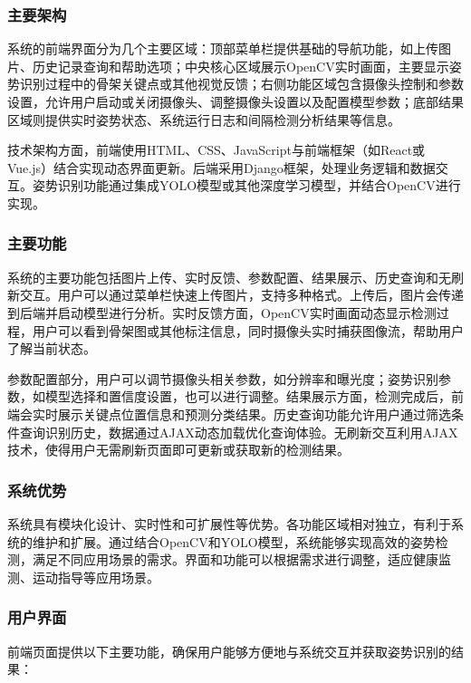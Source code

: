 \subsubsection{主要架构}

系统的前端界面分为几个主要区域：顶部菜单栏提供基础的导航功能，如上传图片、历史记录查询和帮助选项；中央核心区域展示OpenCV实时画面，主要显示姿势识别过程中的骨架关键点或其他视觉反馈；右侧功能区域包含摄像头控制和参数设置，允许用户启动或关闭摄像头、调整摄像头设置以及配置模型参数；底部结果区域则提供实时姿势状态、系统运行日志和间隔检测分析结果等信息。

技术架构方面，前端使用HTML、CSS、JavaScript与前端框架（如React或Vue.js）结合实现动态界面更新。后端采用Django框架，处理业务逻辑和数据交互。姿势识别功能通过集成YOLO模型或其他深度学习模型，并结合OpenCV进行实现。

\subsubsection{主要功能}

系统的主要功能包括图片上传、实时反馈、参数配置、结果展示、历史查询和无刷新交互。用户可以通过菜单栏快速上传图片，支持多种格式。上传后，图片会传递到后端并启动模型进行分析。实时反馈方面，OpenCV实时画面动态显示检测过程，用户可以看到骨架图或其他标注信息，同时摄像头实时捕获图像流，帮助用户了解当前状态。

参数配置部分，用户可以调节摄像头相关参数，如分辨率和曝光度；姿势识别参数，如模型选择和置信度设置，也可以进行调整。结果展示方面，检测完成后，前端会实时展示关键点位置信息和预测分类结果。历史查询功能允许用户通过筛选条件查询识别历史，数据通过AJAX动态加载优化查询体验。无刷新交互利用AJAX技术，使得用户无需刷新页面即可更新或获取新的检测结果。

\subsubsection{系统优势}

系统具有模块化设计、实时性和可扩展性等优势。各功能区域相对独立，有利于系统的维护和扩展。通过结合OpenCV和YOLO模型，系统能够实现高效的姿势检测，满足不同应用场景的需求。界面和功能可以根据需求进行调整，适应健康监测、运动指导等应用场景。

\subsubsection{用户界面}

前端页面提供以下主要功能，确保用户能够方便地与系统交互并获取姿势识别的结果：

